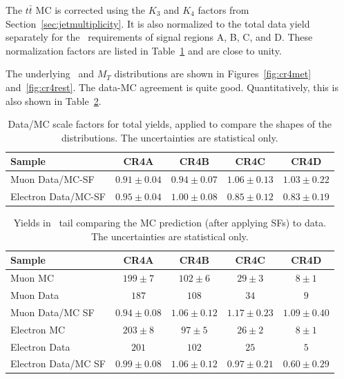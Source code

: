 The $t\bar{t}$ MC is corrected using the $K_3$ and $K_4$ factors
from Section~\ref{sec:jetmultiplicity}.  It is also normalized to the 
total data yield separately for the \met\ requirements of signal
regions A, B, C, and D.  These normalization factors are listed
in Table~\ref{tab:cr4mtsf} and are close to unity.

The underlying \met\ and $M_T$ distributions are shown in 
Figures~\ref{fig:cr4met} and~\ref{fig:cr4rest}.  The data-MC agreement
is quite good.  Quantitatively, this is also shown in Table~\ref{tab:cr4yields}.


\begin{table}[!h]
\begin{center}
\begin{tabular}{l||c|c|c|c}
\hline
Sample              & CR4A & CR4B & CR4C & CR4D \\
\hline
\hline
Muon Data/MC-SF           & $0.91 \pm 0.04$ & $0.94 \pm 0.07$ & $1.06 \pm 0.13$ & $1.03 \pm 0.22$ \\
\hline
\hline
Electron Data/MC-SF       & $0.95 \pm 0.04$ & $1.00 \pm 0.08$ & $0.85 \pm 0.12$ & $0.83 \pm 0.19$ \\
\hline
\end{tabular}
\caption{ Data/MC scale factors for total yields, applied to compare
  the shapes of the distributions.
  The uncertainties are statistical only.
\label{tab:cr4mtsf}}
\end{center}
\end{table}


\begin{table}[!h]
\begin{center}
\begin{tabular}{l||c|c|c|c}
\hline
Sample              & CR4A & CR4B & CR4C & CR4D \\
\hline
\hline
Muon MC                   & $199 \pm 7$ & $102 \pm 6$ & $29 \pm 3$ & $8 \pm 1$ \\
Muon Data                 & $187$ & $108$ & $34$ & $9$ \\
\hline
Muon Data/MC SF           & $0.94 \pm 0.08$ & $1.06 \pm 0.12$ & $1.17 \pm 0.23$ & $1.09 \pm 0.40$ \\
\hline
\hline
Electron MC               & $203 \pm 8$ & $97 \pm 5$ & $26 \pm 2$ & $8 \pm 1$ \\
Electron Data             & $201$ & $102$ & $25$ & $5$ \\
\hline
Electron Data/MC SF       & $0.99 \pm 0.08$ & $1.06 \pm 0.12$ & $0.97 \pm 0.21$ & $0.60 \pm 0.29$ \\
\hline
\end{tabular}
\caption{ Yields in \mt\ tail comparing the MC prediction (after
  applying SFs) to data. The uncertainties are statistical only.
\label{tab:cr4yields}}
\end{center}
\end{table}

